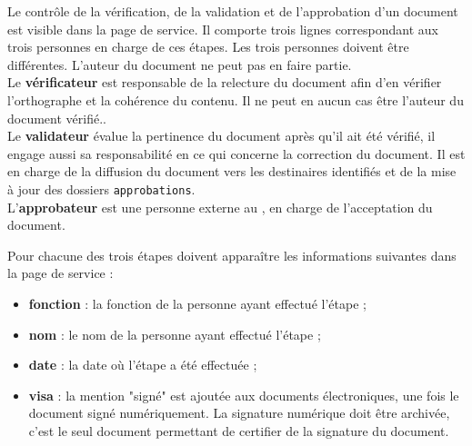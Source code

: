 Le contrôle de la vérification, de la validation et de l’approbation d’un document est visible dans la page de service. Il comporte trois lignes correspondant aux trois personnes en charge de ces étapes. Les trois personnes doivent être différentes. L'auteur du document ne peut pas en faire partie.\\

Le \textbf{vérificateur} est responsable de la relecture du document afin d’en vérifier l’orthographe et la cohérence du contenu. Il ne peut en aucun cas être l'auteur du document vérifié..\\

Le \textbf{validateur} évalue la pertinence du document après qu’il ait été vérifié, il engage aussi sa responsabilité en ce qui concerne la correction du document. Il est en charge de la diffusion du document vers les destinaires identifiés et de la mise à jour des dossiers \verb+approbations+.\\

L’\textbf{approbateur} est une personne externe au \pic{}, en charge de l’acceptation du document.

Pour chacune des trois étapes doivent apparaître les informations suivantes dans la page de service :
\begin{itemize}
\item \textbf{fonction} : la fonction de la personne ayant effectué l’étape ;
\item  \textbf{nom} : le nom de la personne ayant effectué l’étape ;
\item \textbf{date} : la date où l’étape a été effectuée ;
\item \textbf{visa} : la mention "signé" est ajoutée aux documents électroniques, une fois le document signé numériquement. La signature numérique doit être archivée, c'est le seul document permettant de certifier de la signature du document.

\end{itemize}

